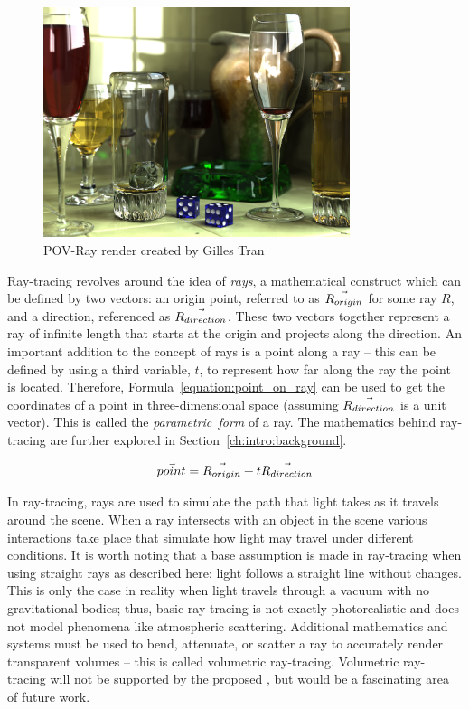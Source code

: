 \begin{figure}[htb]
  \centering
  \includegraphics[width=0.8\textwidth]{resources/glasses_povray}
  \caption{POV-Ray render created by Gilles Tran \cite{povray2006render}}
  \label{fig:povray_render}
\end{figure}


Ray-tracing revolves around the idea of {\it rays}, a mathematical construct which can be defined by two vectors: an origin point, referred to as $\vec{R_{origin}}$ for some ray $R$, and a direction, referenced as $\vec{R_{direction}}$.
These two vectors together represent a ray of infinite length that starts at the origin and projects along the direction.
An important addition to the concept of rays is a point along a ray -- this can be defined by using a third variable, $t$, to represent how far along the ray the point is located.
Therefore, Formula~\ref{equation:point_on_ray} can be used to get the coordinates of a point in three-dimensional space (assuming $\vec{R_{direction}}$ is a unit vector).
This is called the {\it parametric~form} of a ray.
The mathematics behind ray-tracing are further explored in Section~\ref{ch:intro:background}.

\begin{equation}
  \label{equation:point_on_ray}
  \vec{point} = \vec{R_{origin}} + t\vec{R_{direction}}
\end{equation}

In ray-tracing, rays are used to simulate the path that light takes as it travels around the scene.
When a ray intersects with an object in the scene various interactions take place that simulate how light may travel under different conditions.
It is worth noting that a base assumption is made in ray-tracing when using straight rays as described here: light follows a straight line without changes.
This is only the case in reality when light travels through a vacuum with no gravitational bodies; thus, basic ray-tracing is not exactly photorealistic and does not model phenomena like atmospheric scattering.
Additional mathematics and systems must be used to bend, attenuate, or scatter a ray to accurately render transparent volumes -- this is called volumetric ray-tracing.
Volumetric ray-tracing will not be supported by the proposed \name, but would be a fascinating area of future work.

